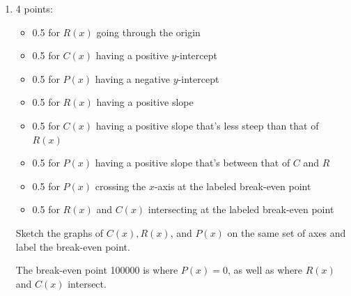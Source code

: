 \documentclass{article}
\begin{document}
\begin{enumerate}
\begin{enumerate}
    \begin{solution} 
      Breaking even means that the profit is zero.
      \begin{align*}
        P(x) &= 0 \\
        .06x -6000 &= 0 \\
        .06x &= 6000 \\
        x &= 100000
      \end{align*}
      So the shop must produce 100000 photocopies to break even.
    \end{solution}

  \item

    \begin{grading}
      4 points:
      \begin{itemize}[nosep]
      \item 0.5 for $R(x)$ going through the origin
      \item 0.5 for $C(x)$ having a positive $y$-intercept
      \item 0.5 for $P(x)$ having a negative $y$-intercept
      \item 0.5 for $R(x)$ having a positive slope
      \item 0.5 for $C(x)$ having a positive slope that's less steep than that of $R(x)$
      \item 0.5 for $P(x)$ having a positive slope that's between that of $C$ and $R$
      \item 0.5 for $P(x)$ crossing the $x$-axis at the labeled break-even point
      \item 0.5 for $R(x)$ and $C(x)$ intersecting at the labeled break-even point 
      \end{itemize}
    \end{grading}

    \begin{problem}[\vfill]
      Sketch the graphs of $C(x), R(x)$, and $P(x)$ on the same set of axes and label the break-even point.
    \end{problem}    

    \begin{solution}
      The break-even point 100000 is where $P(x) = 0$, as well as where $R(x)$ and $C(x)$ intersect.

    \end{solution}


\end{enumerate}
\end{enumerate}
\end{document}
